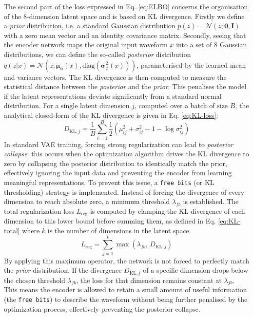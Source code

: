 The second part of the loss expressed in Eq. \ref{eq:ELBO} concerns the organisation of the 8-dimension latent space and is based on \ac{KL} divergence. Firstly we define a \textit{prior} distribution, i.e. a standard Gaussian distribution $p(z) = \mathcal{N}(z; \mathbf{0}, \mathbf{I})$ with a zero mean vector and an identity covariance matrix. Secondly, seeing that the encoder network maps the original input waveform $x$ into a set of 8 Gaussian distributions, we can define the so-called \textit{posterior} distribution $q(z|x) = \mathcal{N}(z; \boldsymbol{\mu}_\phi(x), \text{diag}(\boldsymbol{\sigma}_\phi^2(x)))$, parameterised by the learned mean and variance vectors.
The \ac{KL} divergence is then computed to measure the statistical distance between the \textit{posterior} and the \textit{prior}. This penalises the model if the latent representations deviate significantly from a standard normal distribution. For a single latent dimension $j$, computed over a batch of size $B$, the analytical closed-form of the \ac{KL} divergence is given in Eq. \ref{eq:KL-loss}:
\begin{equation}
    \label{eq:KL-loss}
    D_{\text{KL},j} = \frac{1}{B} \sum_{i=1}^{B} \frac{1}{2} \left( \mu_{ij}^2 + \sigma_{ij}^2 - 1 - \log \sigma_{ij}^2 \right)
\end{equation}
In standard \ac{VAE} training, forcing strong regularization can lead to \textit{posterior collapse}: this occurs when the optimization algorithm drives the \ac{KL} divergence to zero by collapsing the posterior distribution to identically match the prior, effectively ignoring the input data and preventing the encoder from learning meaningful representations. 
To prevent this issue, a \texttt{free bits} (or \ac{KL} thresholding) strategy is implemented. Instead of forcing the divergence of every dimension to reach absolute zero, a minimum threshold $\lambda_{fb}$ is established. The total regularization loss $L_{\text{reg}}$ is computed by clamping the \ac{KL} divergence of each dimension to this lower bound before summing them, as defined in Eq. \ref{eq:KL-total} where $k$ is the number of dimensions in the latent space.
\begin{equation}
    \label{eq:KL-total}
    L_{\text{reg}} = \sum_{j=1}^{k} \max \left( \lambda_{fb}, \, D_{\text{KL},j} \right)
\end{equation}
By applying this maximum operator, the network is not forced to perfectly match the \textit{prior} distribution. If the divergence $D_{\text{KL},j}$ of a specific dimension drops below the chosen threshold $\lambda_{fb}$, the loss for that dimension remains constant at $\lambda_{fb}$. This means the encoder is allowed to retain a small amount of useful information (the \texttt{free bits}) to describe the waveform without being further penalised by the optimization process, effectively preventing the posterior collapse.

